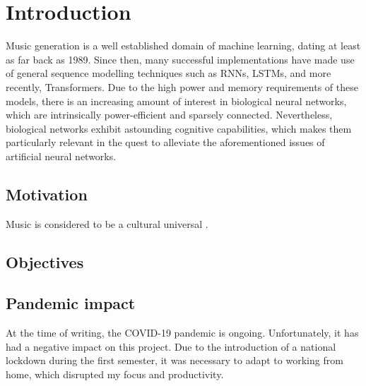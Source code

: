 \documentclass[../../report.tex]{subfiles}
\begin{document}
\chapter{Introduction}

Music generation is a well established domain of machine learning, dating at
least as far back as 1989. Since then, many successful implementations have made
use of general sequence modelling techniques such as RNNs, LSTMs, and more
recently, Transformers. Due to the high power and memory requirements of these
models, there is an increasing amount of interest in biological neural networks,
which are intrinsically power-efficient and sparsely connected. Nevertheless,
biological networks exhibit astounding cognitive capabilities, which makes them
particularly relevant in the quest to alleviate the aforementioned issues of
artificial neural networks.

\section{Motivation}
Music is considered to be a cultural universal \cite{Mehreaax0868}.

\section{Objectives}
\section{Pandemic impact}
At the time of writing, the COVID-19 pandemic is ongoing. Unfortunately, it has had a negative impact on this project. Due to the introduction of a national lockdown during the first semester, it was necessary to adapt to working from home, which disrupted my focus and productivity.
\end{document}
